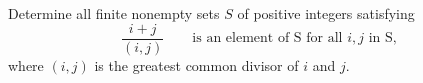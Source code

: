 Determine all finite nonempty sets $S$ of positive integers satisfying \[ \frac{i+j}{\left(i,j\right)}\qquad\text{is an element of S for all }i,j\text{ in S}, \] where $(i,j)$ is the greatest common divisor of $i$ and $j$.